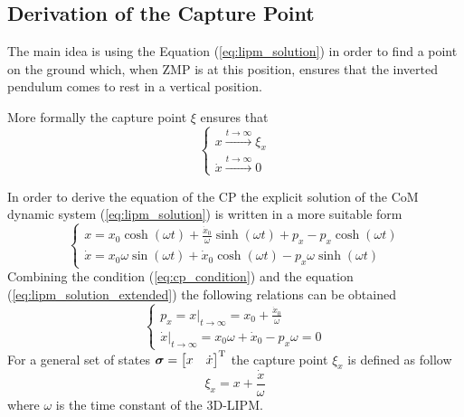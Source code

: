 \subsection{Derivation of the Capture Point}
The main idea is using the Equation (\ref{eq:lipm_solution}) in order to find a point on the ground which, when ZMP is at this position, ensures that the inverted pendulum comes to rest in a vertical position.
\par
More formally the capture point $\xi$ ensures that
\begin{equation}
  \label{eq:cp_condition}
  \begin{cases}
    x \xrightarrow{t\rightarrow \infty} \xi_x\\
    \dot{x} \xrightarrow{t\rightarrow \infty} 0
  \end{cases}
\end{equation}
\par
In order to derive the equation of the CP the explicit solution
of the CoM dynamic system (\ref{eq:lipm_solution})
is written in a more suitable form
\begin{equation}
  \label{eq:lipm_solution_extended}
  \begin{cases}
    x = x_0 \cosh(\omega t) + \frac{\dot{x}_0}{\omega} \sinh(\omega t) + p_x - p_x \cosh(\omega t)\\
    \dot{x} = x_0 \omega \sin(\omega t) + \dot{x}_0 \cosh(\omega t)  - p_x \omega \sinh(\omega t)
  \end{cases}
\end{equation}
Combining the condition (\ref{eq:cp_condition}) and the equation (\ref{eq:lipm_solution_extended})
the following relations can be obtained
\[
\begin{cases}
  p_x = x \big|_{t \rightarrow \infty} = x_0 + \frac{\dot{x}_0}{\omega}\\
  \dot{x} \big|_{t \rightarrow \infty} = x_0 \omega + \dot{x}_0 - p_x \omega = 0
\end{cases}
\]
For a general set of states $\boldsymbol{\sigma} = \begin{bmatrix} x & \dot{x} \end{bmatrix} ^{\mathrm{T}}$
the capture point $\xi_x$ is defined as follow
\begin{equation}
  \label{eq:cp_def}
  \xi_x = x + \frac{\dot{x}}{\omega}
\end{equation}
where $\omega$ is the time constant of the 3D-LIPM.
